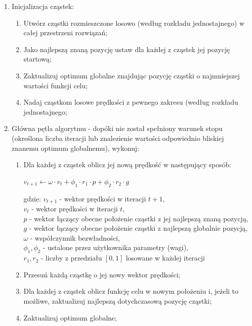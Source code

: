 \documentclass[12pt, twoside, openany, abstract=on]{report}
\theoremstyle{definition}
\begin{document}
\begin{enumerate}
\item Inicjalizacja cząstek:

\begin{enumerate}
\item Utwórz cząstki rozmieszczone losowo (według rozkładu jednostajnego) w całej przestrzeni rozwiązań;
\item Jako najlepszą znaną pozycję ustaw dla każdej z cząstek jej pozycję startową; 
\item Zaktualizuj optimum globalne znajdując pozycję cząstki o najmniejszej wartości funkcji celu; 
\item Nadaj cząstkom losowe prędkości z pewnego zakresu (według rozkładu jednostajnego; 
\end{enumerate}

\item Główna pętla algorytmu - dopóki nie został spełniony warunek stopu (określona liczba iteracji lub znalezienie wartości odpowiednio bliskiej znanemu optimum globalnemu), wykonuj:
\begin{enumerate}

\item Dla każdej z cząstek oblicz jej nową prędkość w następujący sposób:

\begin{center}

$v_{t+1} \leftarrow \omega \cdot v_t + \phi_1 \cdot r_1 \cdot p + \phi_2 \cdot r_2 \cdot g$

\end{center}

gdzie:
$v_{t+1}$ - wektor prędkości w iteracji $t+1$,\\
$v_t$ - wektor prędkości w iteracji $t$,\\
$p$ - wektor łączący obecne położenie cząstki z jej najlepszą znaną pozycją,\\
$g$ - wektor łączący obecne położenie cząstki z najlepszą globalnie pozycją,\\
$\omega$ - współczynnik bezwładności,\\
$\phi_1, \phi_2$ - ustalone przez użytkownika parametry (wagi),\\
$r_1, r_2$ - liczby z przedziału $[0,1]$ losowane w każdej iteracji\\

\item Przesuń każdą cząstkę o jej nowy wektor prędkości;
\item Dla każdej z cząstek oblicz funkcję celu w nowym położeniu i, jeżeli to możliwe, zaktualizuj najlepszą dotychczasową pozycję cząstki; 
\item Zaktualizuj optimum globalne; 
\end{enumerate}
\end{enumerate}
\end{document}
